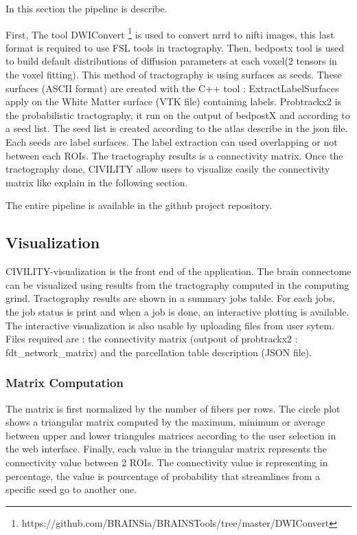 \documentclass[]{spie}  %
\begin{document}
In this section the pipeline is describe. 

First, The tool DWIConvert \footnote{https://github.com/BRAINSia/BRAINSTools/tree/master/DWIConvert} is used to convert nrrd to nifti images, this last format is required to use FSL tools in tractography.
Then, bedpostx tool is used to build default distributions of diffusion parameters at each voxel(2 tensors in the voxel fitting).
This method of tractography is using surfaces as seeds. These surfaces  (ASCII format) are created with the C++ tool : ExtractLabelSurfaces apply on the White Matter surface (VTK file) containing labels.
Probtrackx2 is the probabilistic tractography, it run on the output of bedpostX and according to a seed list. The seed list is created according to the atlas describe in the json file. Each seeds are label surfaces.  The label extraction can used overlapping or not between each ROIs. The tractography results is a connectivity matrix.
Once the tractography done, CIVILITY allow users to visualize easily the connectivity matrix like explain in the following section. 

The entire pipeline is available in the github project repository.

\subsection{Visualization}

CIVILITY-visualization is the front end of the application. The brain connectome can be visualized using results from the tractography computed in the computing grind. 
Tractography results are shown in a summary jobs table. For each jobs, the job status is print and when a job is done, an interactive plotting is available. The interactive visualization is also usable by uploading files from user sytem. Files required are : the connectivity matrix (outpout of probtrackx2 : fdt\_network\_matrix) and the parcellation table description (JSON file).

\subsubsection{Matrix Computation}

The matrix is first normalized by the number of fibers per rows. The circle plot shows a triangular matrix computed by the maximum, minimum or average between upper and lower triangules matrices according to the user selection in the web interface. 
Finally, each value in the triangular matrix represents the connectivity value between 2 ROIs. The connectivity value is representing in percentage, the value is pourcentage of probability that streamlines from a specific seed go to another one.
\end{document}

